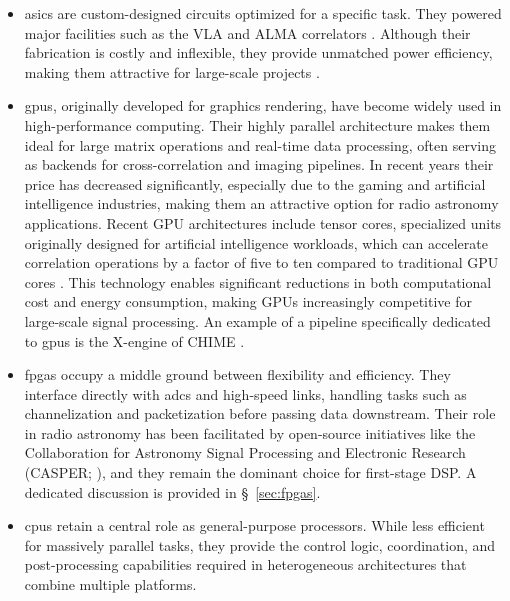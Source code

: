 \begin{itemize}
	\item \Glspl{asic} are custom-designed circuits optimized for a specific task. They powered major facilities such as the VLA and ALMA correlators \citep{Perley_2009,ALMA_correlator}. Although their fabrication is costly and inflexible, they provide unmatched power efficiency, making them attractive for large-scale projects \citep{D_Addario_2016}.  

	\item \Glspl{gpu}, originally developed for graphics rendering, have become widely used in high-performance computing. Their highly parallel architecture makes them ideal for large matrix operations and real-time data processing, often serving as backends for cross-correlation and imaging pipelines. In recent years their price has decreased significantly, especially due to the gaming and artificial intelligence industries, making them an attractive option for radio astronomy applications. Recent GPU architectures include tensor cores, specialized units originally designed for artificial intelligence workloads, which can accelerate correlation operations by a factor of five to ten compared to traditional GPU cores \citep{TensorCoreCorrelator}. This technology enables significant reductions in both computational cost and energy consumption, making GPUs increasingly competitive for large-scale signal processing. 
	An example of a pipeline specifically dedicated to \glspl{gpu} is the X-engine of CHIME \citep{Denman_2020}. 

	\item \Glspl{fpga} occupy a middle ground between flexibility and efficiency. They interface directly with \glspl{adc} and high-speed links, handling tasks such as channelization and packetization before passing data downstream. Their role in radio astronomy has been facilitated by open-source initiatives like the Collaboration for Astronomy Signal Processing and Electronic Research (CASPER; \citealt{hickish2016decadedevelopingradioastronomyinstrumentation}), and they remain the dominant choice for first-stage DSP. A dedicated discussion is provided in \S~\ref{sec:fpgas}. 
	\item \glspl{cpu} retain a central role as general-purpose processors. While less efficient for massively parallel tasks, they provide the control logic, coordination, and post-processing capabilities required in heterogeneous architectures that combine multiple platforms. 
\end{itemize} 

